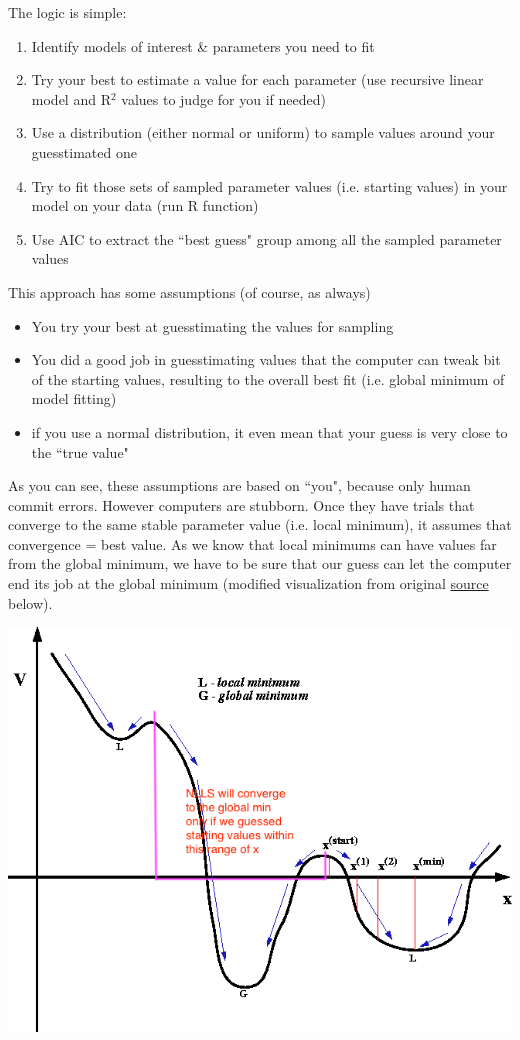 \documentclass[../note.tex]{subfiles} %
\begin{document}
The logic is simple:
\begin{enumerate}
    \item Identify models of interest \& parameters you need to fit
    \item Try your best to estimate a value for each parameter (use recursive linear model and R$^2$ values to judge for you if needed)
    \item Use a distribution (either normal or uniform) to sample values around your guesstimated one
    \item Try to fit those sets of sampled parameter values (i.e. starting values) in your model on your data (run R function)
    \item Use AIC to extract the ``best guess" group among all the sampled parameter values
\end{enumerate}
This approach has some assumptions (of course, as always)
\begin{itemize}
    \item You try your best at guesstimating the values for sampling
    \item You did a good job in guesstimating values that the computer can tweak bit of the starting values, resulting to the overall best fit (i.e. global minimum of model fitting)
    \item if you use a normal distribution, it even mean that your guess is very close to the ``true value"
\end{itemize}
As you can see, these assumptions are based on ``you", because only human commit errors.  However computers are stubborn.  Once they have trials that converge to the same stable parameter value (i.e. local minimum), it assumes that convergence = best value.  As we know that local minimums can have values far from the global minimum, we have to be sure that our guess can let the computer end its job at the global minimum (modified visualization from original \href{http://www.ccl.net/cca/documents/molecular-modeling/fig22.gif}{source} below).
\begin{center}
    \includegraphics[width=.7\linewidth]{../graph/locMin.png}
\end{center}
\end{document}
